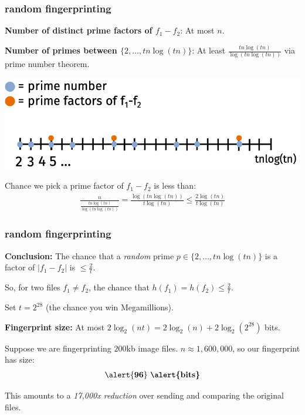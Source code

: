 \documentclass[handout,compress]{beamer}
\begin{document}
\begin{frame}[t]
	\frametitle{random fingerprinting}
	\textbf{Number of distinct prime factors of $f_1 - f_2$}: At most $n$.
	\vspace{1em}
	
	\textbf{Number of primes between $\{2, \ldots, tn\log(tn)\}$}: At least $\frac{tn\log(tn)}{\log(tn\log(tn))}$ via prime number theorem.
	
	\vspace{-.25em}
	\begin{center}
		\includegraphics[width=.8\textwidth]{number_line.png}
	\end{center}
	\vspace{-.25em}
Chance we pick a prime factor of $f_1 - f_2$ is less than:
	\begin{align*}
		\frac{n}{\frac{tn\log(tn)}{\log(tn\log(tn))}} =  \frac{\log(tn\log(tn))}{t\log(tn)} \leq \frac{2\log(tn)}{t\log(tn)}
	\end{align*}	
	
\end{frame}


\begin{frame}[t]
	\frametitle{random fingerprinting}
	\textbf{Conclusion:} The chance that a \emph{random} prime $p\in \{2, \ldots, tn\log(tn)\}$ is a factor of $|f_1 - f_2|$ is $\leq \frac{2}{t}$.
	
	So, for two files $f_1 \neq f_2$, the chance that $h(f_1) = h(f_2) \leq \frac{2}{t}$.
	\vspace{2em}
	
	Set $t = 2^{28}$ (the chance you win Megamillions).
	
	\textbf{Fingerprint size:} At most $2\log_2(nt) = 2\log_2(n) + 2\log_2(2^{28})$ bits. 
	
	Suppose we are fingerprinting $200$kb image files. $n \approx 1,600,000$, so our fingerprint has size:
	\begin{align*}
		\alert{\mathbf{96}}\text{ \textbf{\alert{bits}}}
	\end{align*}
	
	This amounts to a \emph{17,000x reduction} over sending and comparing the original files.
\end{frame}
\end{document}
